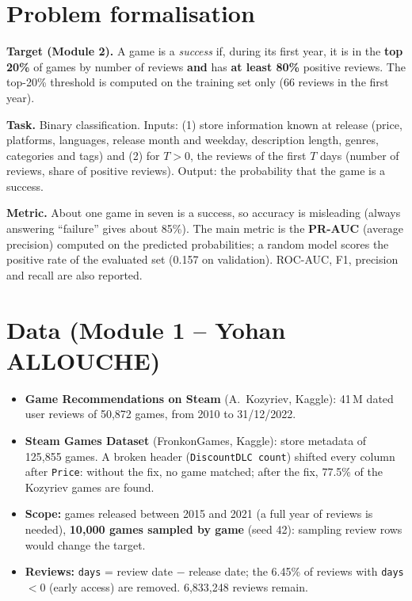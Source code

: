 \documentclass[11pt,a4paper]{article}
\newcommand{\code}[1]{\texttt{#1}}
\begin{document}
\section{Problem formalisation}

\textbf{Target (Module 2).} A game is a \emph{success} if, during its first year, it is in the
\textbf{top 20\%} of games by number of reviews \textbf{and} has \textbf{at least 80\%} positive reviews.
The top-20\% threshold is computed on the training set only (66 reviews in the first year).

\textbf{Task.} Binary classification. Inputs: (1) store information known at release (price, platforms,
languages, release month and weekday, description length, genres, categories and tags) and (2) for
$T > 0$, the reviews of the first $T$ days (number of reviews, share of positive reviews).
Output: the probability that the game is a success.

\textbf{Metric.} About one game in seven is a success, so accuracy is misleading (always answering
``failure'' gives about 85\%). The main metric is the \textbf{PR-AUC} (average precision) computed on the
predicted probabilities; a random model scores the positive rate of the evaluated set (0.157 on validation).
ROC-AUC, F1, precision and recall are also reported.

\section{Data (Module 1 -- Yohan ALLOUCHE)}

\begin{itemize}
  \item \textbf{Game Recommendations on Steam} (A.~Kozyriev, Kaggle): 41\,M dated user reviews of
        50{,}872 games, from 2010 to 31/12/2022.
  \item \textbf{Steam Games Dataset} (FronkonGames, Kaggle): store metadata of 125{,}855 games.
        A broken header (\code{DiscountDLC count}) shifted every column after \code{Price}: without the
        fix, no game matched; after the fix, 77.5\% of the Kozyriev games are found.
  \item \textbf{Scope:} games released between 2015 and 2021 (a full year of reviews is needed),
        \textbf{10{,}000 games sampled by game} (seed 42): sampling review rows would change the target.
  \item \textbf{Reviews:} \code{days} = review date $-$ release date; the 6.45\% of reviews with
        \code{days} $< 0$ (early access) are removed. 6{,}833{,}248 reviews remain.
\end{itemize}
\end{document}
